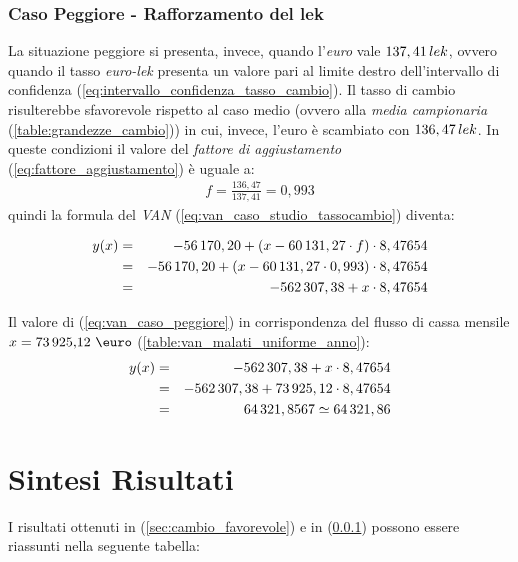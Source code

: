 \subsubsection[Caso Peggiore - Rafforzamento del lek]{Caso Peggiore - Rafforzamento del lek}
\label{sec:cambio_sfavorevole}
La situazione peggiore si presenta, invece, quando l'\emph{euro} vale $137,41 \thinspace lek$, ovvero quando il tasso \emph{euro-lek} presenta un valore pari al limite destro dell'intervallo di confidenza (\ref{eq:intervallo_confidenza_tasso_cambio}). Il tasso di cambio risulterebbe sfavorevole rispetto al caso medio (ovvero alla \textit{media campionaria} (\ref{table:grandezze_cambio})) in cui, invece, l'euro è scambiato con $136,47 \thinspace lek$.\newline
In queste condizioni il valore del \textit{fattore di aggiustamento}  (\ref{eq:fattore_aggiustamento}) è uguale a:
\begin{equation}
\label{eq:fattore_aggiustamento_caso_peggiore}
\begin{split}
f = \frac{136,47}{137,41} = 0,993
\end{split}
\end{equation}
quindi la formula del \emph{\ac{VAN}} (\ref{eq:van_caso_studio_tassocambio}) diventa:

\begin{eqnarray}
\label{eq:van_caso_peggiore}
 		y(x) & = & -56\thinspace 170,20 + (x - 60\thinspace 131,27 \cdot f) \cdot 8,47654 \nonumber \\
 			 & = & -56\thinspace 170,20 + (x - 60\thinspace 131,27 \cdot 0,993) \cdot 8,47654 \nonumber \\
 			 & = & -562\thinspace 307,38 + x \cdot 8,47654
\end{eqnarray}

Il valore di (\ref{eq:van_caso_peggiore}) in corrispondenza del flusso di cassa mensile $ x = \mbox{73\thinspace 925,12 \euro}$ (\ref{table:van_malati_uniforme_anno}):
\begin{eqnarray}
\label{eq:van_flusso_cassa_malati_uniforme_caso_peggiore}
 		y(x) & = & -562\thinspace 307,38 + x \cdot 8,47654 \nonumber \\
 			 & = & -562\thinspace 307,38 + 73\thinspace 925,12 \cdot 8,47654 \nonumber \\
 			 & = & 64\thinspace 321,8567 \simeq 64\thinspace 321,86
\end{eqnarray}


\section[Sintesi Risultati]{Sintesi Risultati}
I risultati ottenuti in (\ref{sec:cambio_favorevole}) e in (\ref{sec:cambio_sfavorevole}) possono essere riassunti nella seguente tabella:

